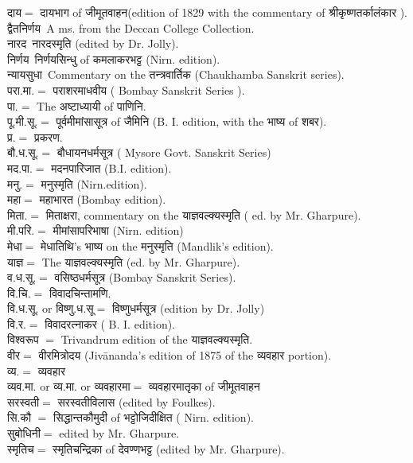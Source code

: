 \documentclass[11pt, openany]{book}
\begin{document}
\fancyhead[RE,LO]{\thepage}
\cfoot{}
\newpage
\renewcommand{\thepage}{\arabic{page}}
\setcounter{page}{2}


\noindent
{\small दाय$=$ दायभाग of जीमूतवाहन(edition of 1829 with the commentary of श्रीकृष्णतर्कालंकार ).\\
द्वैतनिर्णय\textendash\ A ms. from the Deccan College Collection.\\
नारद\textendash\ नारदस्मृति (edited by Dr. Jolly).\\
निर्णय\textendash\ निर्णयसिन्धु of कमलाकरभट्ट (Nirn. edition).\\
न्यायसुधा\textendash\ Commentary on the तन्त्रवार्तिक (Chaukhamba Sanskrit series).\\
परा.मा.$=$ पराशरमाधवीय ( Bombay Sanskrit Series ).\\
पा.$=$ The अष्टाध्यायी of पाणिनि.\\
पू.मी.सू.$=$ पूर्वमीमांसासूत्र of जैमिनि (B. I. edition, with the भाष्य of शबर).\\
प्र.$=$ प्रकरण.\\
बौ.ध.सू.$=$ बौधायनधर्मसूत्र ( Mysore Govt. Sanskrit Series)\\
मद.पा.$=$ मदनपारिजात (B.I. edition).\\
मनु.$=$ मनुस्मृति (Nirn.edition).\\
महा$=$ महाभारत (Bombay edition).\\
मिता.$=$ मिताक्षरा, commentary on the याज्ञवल्क्यस्मृति ( ed. by Mr. Gharpure).\\
मी.परि.$=$ मीमांसापरिभाषा (Nirn. edition)\\
मेधा$=$ मेधातिथि's भाष्य on the मनुस्मृति (Mandlik's edition).\\
याज्ञ$=$ The याज्ञवल्क्यस्मृति (ed. by Mr. Gharpure).\\
व.ध.सू.$=$ वसिष्ठधर्मसूत्र (Bombay Sanskrit Series).\\
वि.चि.$=$ विवादचिन्तामणि.\\
वि.ध.सू. or विष्णु.ध.सू$=$ विष्णुधर्मसूत्र (edition by Dr. Jolly)\\
वि.र.$=$ विवादरत्नाकर ( B. I. edition).\\
विश्वरूप $=$ Trivandrum edition of the याज्ञवल्क्यस्मृति.\\
वीर$=$ वीरमित्रोदय (Jivānanda's edition of 1875 of the व्यवहार portion).\\
व्य.$=$ व्यवहार\\
व्यव.मा. or व्य.मा. or व्यवहारमा$=$ व्यवहारमातृका of जीमूतवाहन\\
सरस्वती$=$ सरस्वतीविलास (edited by Foulkes).\\
सि.कौ $=$ सिद्धान्तकौमुदी of भट्टोजिदीक्षित ( Nirn. edition).\\
सुबोधिनी$=$ edited by Mr. Gharpure.\\
स्मृतिच$=$ स्मृतिचन्द्रिका of देवण्णभट्ट (edited by Mr. Gharpure).}
\end{document}
